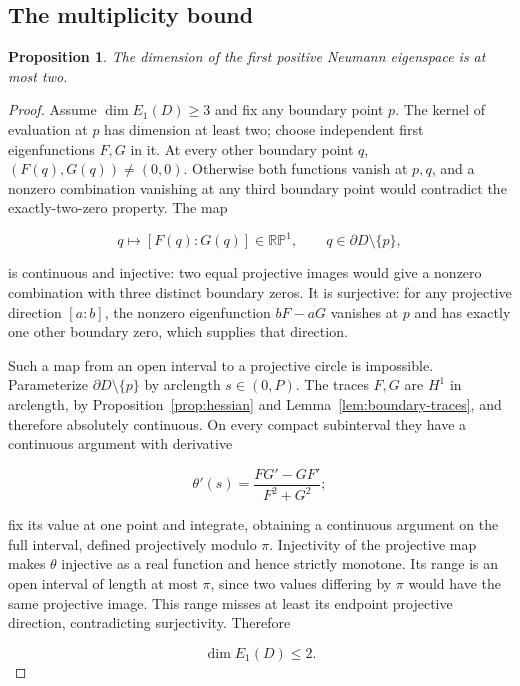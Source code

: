 \documentclass[11pt]{article}
\newtheorem{proposition}[theorem]{Proposition}
\theoremstyle{definition}
\theoremstyle{remark}
\numberwithin{equation}{section}
\begin{document}
\subsection{The multiplicity bound}\label{subsec:12.4}
\begin{proposition}\label{prop:multiplicity}
The dimension of the first positive Neumann eigenspace is at most two.
\end{proposition}
\begin{proof}

Assume $\dim E_1(D)\ge3$ and fix any boundary point $p$. The kernel of evaluation at $p$ has dimension at least two; choose independent first eigenfunctions $F,G$ in it. At every other boundary point $q$, $(F(q),G(q))\ne(0,0)$. Otherwise both functions vanish at $p,q$, and a nonzero combination vanishing at any third boundary point would contradict the exactly-two-zero property. The map

\begin{equation}\label{eq:src-12-03}
q\longmapsto[F(q):G(q)]\in\mathbb{RP}^1,\qquad q\in\partial D\setminus\{p\},
\end{equation}

is continuous and injective: two equal projective images would give a nonzero combination with three distinct boundary zeros. It is surjective: for any projective direction $[a:b]$, the nonzero eigenfunction $bF-aG$ vanishes at $p$ and has exactly one other boundary zero, which supplies that direction.

Such a map from an open interval to a projective circle is impossible. Parameterize $\partial D\setminus\{p\}$ by arclength $s\in(0,P)$. The traces $F,G$ are $H^1$ in arclength, by Proposition~\ref{prop:hessian} and Lemma~\ref{lem:boundary-traces}, and therefore absolutely continuous. On every compact subinterval they have a continuous argument with derivative

\begin{equation}\label{eq:src-12-04}
\theta'(s)=\frac{FG'-GF'}{F^2+G^2};
\end{equation}

fix its value at one point and integrate, obtaining a continuous argument on the full interval, defined projectively modulo $\pi$. Injectivity of the projective map makes $\theta$ injective as a real function and hence strictly monotone. Its range is an open interval of length at most $\pi$, since two values differing by $\pi$ would have the same projective image. This range misses at least its endpoint projective direction, contradicting surjectivity. Therefore

\begin{equation}\label{eq:src-12-05}
\dim E_1(D)\le2.
\end{equation}
\end{proof}
\end{document}
